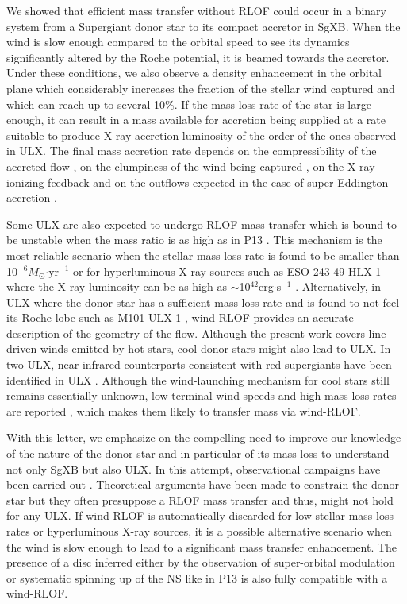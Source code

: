 \documentclass[letter]{aa}
\makeatletter
\newcommand{\sgx}{SgXB\xspace}
\newcommand{\ulx}{ULX\xspace}
\newcommand*{\rlof}{RLOF\@\xspace}
\newcommand*{\ns}{NS\@\xspace}
\newcommand*{\eg}{e.g.\@\xspace}
\newcommand*{\msun}{$M_{\odot}$\@\xspace}
\makeatother
\begin{document}
We showed that efficient mass transfer without \rlof could occur in a binary system from a Supergiant donor star to its compact accretor in \sgx. When the wind is slow enough compared to the orbital speed to see its dynamics significantly altered by the Roche potential, it is beamed towards the accretor. Under these conditions, we also observe a density enhancement in the orbital plane which considerably increases the fraction of the stellar wind captured and which can reach up to several 10\%. If the mass loss rate of the star is large enough, it can result in a mass available for accretion being supplied at a rate suitable to produce X-ray accretion luminosity of the order of the ones observed in \ulx. The final mass accretion rate depends on the compressibility of the accreted flow \citep{MacLeod2017}, on the clumpiness of the wind being captured \citep{Sundqvist2017}, on the X-ray ionizing feedback \cite{Manousakis2015c} and on the outflows expected in the case of super-Eddington accretion \citep{Pinto2016a}.

Some \ulx are also expected to undergo \rlof mass transfer which is bound to be unstable when the mass ratio is as high as in P13 \citep{King2002,Rappaport2005}. This mechanism is the most reliable scenario when the stellar mass loss rate is found to be smaller than 10$^{-6}$\msun$\cdot$yr$^{-1}$ or for hyperluminous X-ray sources such as ESO 243-49 HLX-1 where the X-ray luminosity can be as high as $\sim$10$^{42}$erg$\cdot$s$^{-1}$ \citep{Farrell2009,Webb2017}. Alternatively, in \ulx where the donor star has a sufficient mass loss rate and is found to not feel its Roche lobe such as M101 ULX-1 \citep{Liu2013}, wind-\rlof provides an accurate description of the geometry of the flow. Although the present work covers line-driven winds emitted by hot stars, cool donor stars might also lead to \ulx. In two ULX, near-infrared counterparts consistent with red supergiants have been identified in ULX \citep{Heida2015,Heida2016}. Although the wind-launching mechanism for cool stars still remains essentially unknown, low terminal wind speeds and high mass loss rates are reported \citep{XXX}, which makes them likely to transfer mass via wind-\rlof \citep{Mohamed2007,DeVal-Borro2017}.

With this letter, we emphasize on the compelling need to improve our knowledge of the nature of the donor star and in particular of its mass loss to understand not only \sgx but also \ulx. In this attempt, observational campaigns have been carried out \cite[see \eg][]{Heida2014}. Theoretical arguments have been made to constrain the donor star but they often presuppose a \rlof mass transfer and thus, might not hold for any \ulx \citep{Karino2017}. If wind-\rlof is automatically discarded for low stellar mass loss rates or hyperluminous X-ray sources, it is a possible alternative scenario when the wind is slow enough to lead to a significant mass transfer enhancement. The presence of a disc inferred either by the observation of super-orbital modulation or systematic spinning up of the \ns like in P13 \citep{Fuerst2018} is also fully compatible with a wind-\rlof \citep{ElMellah2019}.
\end{document}
